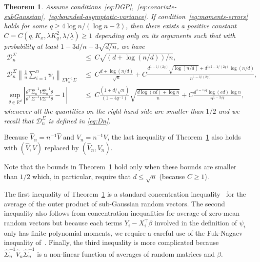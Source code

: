 \documentclass[11pt]{article}
\newtheorem{theorem}{Theorem}
\begin{document}
\begin{theorem}\label{thm:main-rates-thm-OLS-independence}
Assume conditions~\ref{eq:DGP},~\ref{eq:covariate-subGaussian},~\ref{eq:bounded-asymptotic-variance}. If condition~\ref{eq:moments-errors} holds for some $q \ge 4\log n/(\log n - 2)$, then there exists a positive constant $C = C(q, K_x, \overline{\lambda} K_q^2, \overline{\lambda}/\underline{\lambda}) \ge 1$ depending only on its arguments such that with probability at least $1 - 3d/n - 3\sqrt{d/n}$, we have
\begin{equation}\label{eq:main-quantity-bounds}
\begin{split}
\mathcal{D}_n^{\Sigma} ~&\le~ C\sqrt{(d + \log(n/d))/n},\\
\mathcal{D}_n^{\Sigma}\left\|\frac{1}{n}\sum_{i=1}^n \psi_i\right\|_{\Sigma V_n^{-1}\Sigma} ~&\le~ C\frac{d + \log(n/d)}{\sqrt{n}}%
+ C\frac{d^{1-1/(2q)}\sqrt{\log(n/d)} + d^{1/2 - 1/(2q)}\log(n/d)}{n^{1-3/(2q)}},\\
\sup_{\theta\in\mathbb{R}^d}\left|\frac{\theta^{\top}\widehat{\Sigma}^{-1}_n\widehat{V}\widehat{\Sigma}_n^{-1}\theta}{\theta^{\top}\Sigma^{-1}V\Sigma^{-1}\theta} - 1\right| ~&\le~ C\frac{(1 + d/\sqrt{n})}{(1-4q^{-1})}\sqrt{\frac{d\log(ed) + \log n}{n}}
+ C\frac{d^{1-1/q}\log(ed)\log n}{n^{1-3/q}},
\end{split}
\end{equation} 
whenever all the quantities on the right hand side are smaller than $1/2$ and we recall that $\mathcal{D}_n^{\Sigma}$ is defined in \eqref{eq:Dn}. %
\end{theorem}
Because $\widehat{V}_n = n^{-1}\widehat{V}$ and $V_n = n^{-1}V$, the last inequality of Theorem~\ref{thm:main-rates-thm-OLS-independence} also holds with $(\widehat{V}, V)$ replaced by $(\widehat{V}_n, V_n)$.

Note that the bounds in Theorem~\ref{thm:main-rates-thm-OLS-independence} hold only when these bounds are smaller than $1/2$ which, in particular, require that $d \le \sqrt{n}$ (because $C \ge 1$). 

The first inequality of Theorem~\ref{thm:main-rates-thm-OLS-independence} is a standard concentration inequality~\citep[see, e.g.][Theorem 1]{koltchinskii2017a} for the average of the outer product of sub-Gaussian random vectors. 
The second inequality also follows from concentration inequalities for average of zero-mean random vectors but because each terms $Y_i - X_i^{\top}\beta$ involved in the definition of $\psi_i$ only has finite polynomial moments, we require a careful use of the Fuk-Nagaev inequality of~\cite{einmahl2008characterization}. Finally, the third inequality is more complicated because $\widehat{\Sigma}^{-1}_n\widehat{V}_n\widehat{\Sigma}_n^{-1}$ is a non-linear function of averages of random matrices and $\widehat{\beta}$.   
\end{document}
